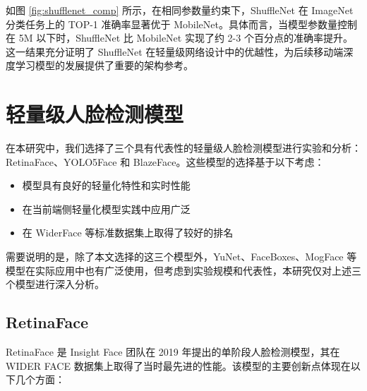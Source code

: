\documentclass{article}
\begin{document}
如图 \ref{fig:shufflenet_comp} 所示，在相同参数量约束下，ShuffleNet 在 ImageNet 分类任务上的 TOP-1 准确率显著优于 MobileNet。具体而言，当模型参数量控制在 5M 以下时，ShuffleNet 比 MobileNet 实现了约 2-3 个百分点的准确率提升。这一结果充分证明了 ShuffleNet 在轻量级网络设计中的优越性，为后续移动端深度学习模型的发展提供了重要的架构参考。

\clearpage

\section{轻量级人脸检测模型}

在本研究中，我们选择了三个具有代表性的轻量级人脸检测模型进行实验和分析：RetinaFace、YOLO5Face 和 BlazeFace。这些模型的选择基于以下考虑：
\begin{itemize}
    \item 模型具有良好的轻量化特性和实时性能
    \item 在当前端侧轻量化模型实践中应用广泛
    \item 在 WiderFace 等标准数据集上取得了较好的排名
\end{itemize}

需要说明的是，除了本文选择的这三个模型外，YuNet、FaceBoxes、MogFace 等模型在实际应用中也有广泛使用，但考虑到实验规模和代表性，本研究仅对上述三个模型进行深入分析。

\subsection{RetinaFace}
RetinaFace\cite{deng2019retinaface} 是 Insight Face 团队在 2019 年提出的单阶段人脸检测模型，其在 WIDER FACE 数据集上取得了当时最先进的性能。该模型的主要创新点体现在以下几个方面：
\end{document}

